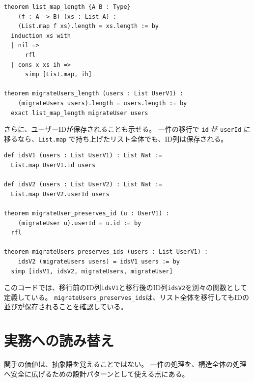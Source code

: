 \begin{listing}[htbp]
\begin{verbatim}
theorem list_map_length {A B : Type}
    (f : A -> B) (xs : List A) :
    (List.map f xs).length = xs.length := by
  induction xs with
  | nil =>
      rfl
  | cons x xs ih =>
      simp [List.map, ih]

theorem migrateUsers_length (users : List UserV1) :
    (migrateUsers users).length = users.length := by
  exact list_map_length migrateUser users
\end{verbatim}
\caption{List.map はリストの長さを保存する}
\label{lst:ch08_list_map_length}
\end{listing}

さらに、ユーザーIDが保存されることも示せる。
一件の移行で \texttt{id} が \texttt{userId} に移るなら、\texttt{List.map} で持ち上げたリスト全体でも、ID列は保存される。

\begin{listing}[htbp]
\begin{verbatim}
def idsV1 (users : List UserV1) : List Nat :=
  List.map UserV1.id users

def idsV2 (users : List UserV2) : List Nat :=
  List.map UserV2.userId users

theorem migrateUser_preserves_id (u : UserV1) :
    (migrateUser u).userId = u.id := by
  rfl

theorem migrateUsers_preserves_ids (users : List UserV1) :
    idsV2 (migrateUsers users) = idsV1 users := by
  simp [idsV1, idsV2, migrateUsers, migrateUser]
\end{verbatim}
\caption{リスト全体の移行で ID 列が保存される}
\label{lst:ch08_preserve_ids}
\end{listing}

このコードでは、移行前のID列\texttt{idsV1}と移行後のID列\texttt{idsV2}を別々の関数として定義している。
\texttt{migrateUsers\_preserves\_ids}は、リスト全体を移行してもIDの並びが保存されることを確認している。


\section{実務への読み替え}

関手の価値は、抽象語を覚えることではない。
一件の処理を、構造全体の処理へ安全に広げるための設計パターンとして使える点にある。


